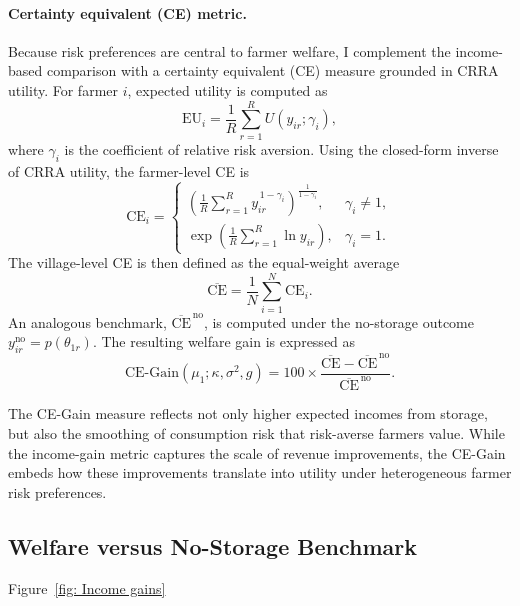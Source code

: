 \paragraph{Certainty equivalent (CE) metric.}  
Because risk preferences are central to farmer welfare, I complement the income-based comparison with a certainty equivalent (CE) measure grounded in CRRA utility. For farmer $i$, expected utility is computed as  
\begin{equation}
\mathrm{EU}_i
=\frac{1}{R}\sum_{r=1}^R U(y_{ir};\gamma_i),
\end{equation}
where $\gamma_i$ is the coefficient of relative risk aversion. Using the closed-form inverse of CRRA utility, the farmer-level CE is  
\begin{equation}
\mathrm{CE}_i=
\begin{cases}
\left(\frac{1}{R}\sum_{r=1}^R y_{ir}^{\,1-\gamma_i}\right)^{\!\!\tfrac{1}{1-\gamma_i}}, & \gamma_i\neq 1,\\[8pt]
\exp\!\left(\frac{1}{R}\sum_{r=1}^R \ln y_{ir}\right), & \gamma_i=1.
\end{cases}
\end{equation}
The village-level CE is then defined as the equal-weight average  
\[
\overline{\mathrm{CE}}=\frac{1}{N}\sum_{i=1}^N \mathrm{CE}_i.
\]  
An analogous benchmark, $\overline{\mathrm{CE}}^{\,\text{no}}$, is computed under the no-storage outcome $y^{\text{no}}_{ir}=p(\theta_{1r})$. The resulting welfare gain is expressed as  
\begin{equation}
\mathrm{CE\text{-}Gain}(\mu_1;\kappa,\sigma^2,g)
=100\times
\frac{\overline{\mathrm{CE}}-\overline{\mathrm{CE}}^{\,\text{no}}}{\overline{\mathrm{CE}}^{\,\text{no}}}.
\end{equation}

The CE-Gain measure reflects not only higher expected incomes from storage, but also the smoothing of consumption risk that risk-averse farmers value. While the income-gain metric captures the scale of revenue improvements, the CE-Gain embeds how these improvements translate into utility under heterogeneous farmer risk preferences.



\subsection{Welfare versus No-Storage Benchmark}
Figure~\ref{fig: Income gains} 



